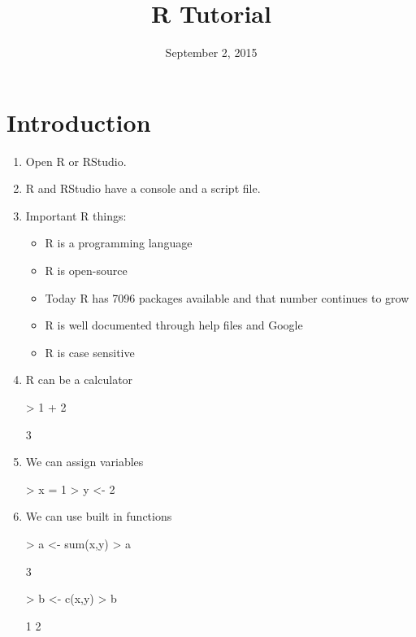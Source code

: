 \documentclass[12pt]{article}
\begin{document}



\title{R Tutorial}
\date{September 2, 2015}

\maketitle

\section{Introduction}

\begin{enumerate}

\item Open R or RStudio. 
\item R and RStudio have a console and a script file. 
\item Important R things:
  \begin{itemize}
  \item R is a programming language
  \item R is open-source
  \item Today R has 7096 packages available and that number continues to grow
  \item R is well documented through help files and Google
  \item R is case sensitive
  \end{itemize}
  
\item R can be a calculator
\begin{Schunk}
\begin{Sinput}
> 1 + 2 
\end{Sinput}
\begin{Soutput}
[1] 3
\end{Soutput}
\end{Schunk}

\item We can assign variables
\begin{Schunk}
\begin{Sinput}
> x = 1
> y <- 2
\end{Sinput}
\end{Schunk}

\item We can use built in functions
\begin{Schunk}
\begin{Sinput}
> a <- sum(x,y)
> a
\end{Sinput}
\begin{Soutput}
[1] 3
\end{Soutput}
\begin{Sinput}
> b <- c(x,y)
> b
\end{Sinput}
\begin{Soutput}
[1] 1 2
\end{Soutput}
\end{Schunk}


\end{enumerate}
\end{document}

